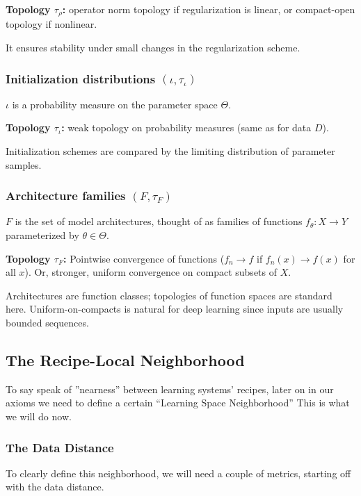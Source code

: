 \documentclass[12pt]{article}
\begin{document}
\textbf{Topology $\tau_\rho$:} operator norm topology if regularization is linear, or compact-open topology if nonlinear.

It ensures stability under small changes in the regularization scheme.

\subsubsection{Initialization distributions $(\iota, \tau_\iota)$}

$\iota$ is a probability measure on the parameter space $\Theta$.

\textbf{Topology $\tau_\iota$:} weak topology on probability measures (same as for data $D$).

Initialization schemes are compared by the limiting distribution of parameter samples.

\subsubsection{Architecture families $(F, \tau_F)$}

$F$ is the set of model architectures, thought of as families of functions $f_\theta:  X \to Y$parameterized by $\theta \in \Theta$.

\textbf{Topology $\tau_F$:} Pointwise convergence of functions ($f_n \to f$ if $f_n(x)\to f(x)$ for all $x$). Or, stronger, uniform convergence on compact subsets of $X$.

Architectures are function classes; topologies of function spaces are standard here. Uniform-on-compacts is natural for deep learning since inputs are usually bounded sequences.

\subsection{The Recipe-Local Neighborhood}

To say speak of ”nearness” between learning systems’ recipes, later on in our axioms we need to define a certain “Learning Space Neighborhood” This is what we will do now.

\subsubsection{The Data Distance}

To clearly define this neighborhood, we will need a couple of metrics, starting off with the data distance.
\end{document}

